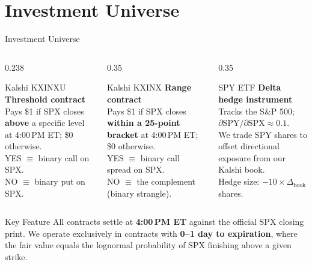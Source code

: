 \documentclass[aspectratio=169]{beamer}
\begin{document}
\section{Investment Universe}

\begin{frame}{Investment Universe}
  \begin{columns}[T,onlytextwidth]
    \begin{column}{0.238\textwidth}
      \begin{block}{Kalshi KXINXU}
        \footnotesize
        \textbf{Threshold contract}\\[3pt]
        Pays \$1 if SPX closes \textbf{above} a specific level at 4:00\,PM ET; \$0 otherwise.\\[3pt]
        YES $\equiv$ binary call on SPX.\\
        NO $\equiv$ binary put on SPX.
      \end{block}
    \end{column}
    \begin{column}{0.35\textwidth}
      \begin{block}{Kalshi KXINX}
        \footnotesize
        \textbf{Range contract}\\[3pt]
        Pays \$1 if SPX closes \textbf{within a 25-point bracket} at 4:00\,PM ET; \$0 otherwise.\\[3pt]
        YES $\equiv$ binary call spread on SPX.\\
        NO $\equiv$ the complement (binary strangle).
      \end{block}
    \end{column}
    \begin{column}{0.35\textwidth}
      \begin{block}{SPY ETF}
        \footnotesize
        \textbf{Delta hedge instrument}\\[3pt]
        Tracks the S\&P 500; $\partial\text{SPY}/\partial\text{SPX} \approx 0.1$.\\[3pt]
        We trade SPY shares to offset directional exposure from our Kalshi book.\\
        Hedge size: $-10 \times \Delta_{\text{book}}$ shares.
      \end{block}
    \end{column}
  \end{columns}
  \vspace{0.4em}
  \begin{block}{Key Feature}
    \small
    All contracts settle at \textbf{4:00\,PM ET} against the official SPX closing print.
    We operate exclusively in contracts with \textbf{0--1 day to expiration}, where
    the fair value equals the lognormal probability of SPX finishing above a given strike.
  \end{block}
\end{frame}
\end{document}
